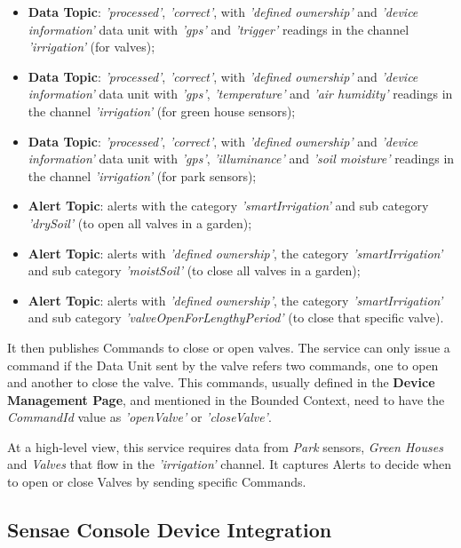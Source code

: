 \begin{itemize}
    \item \textbf{Data Topic}: \textit{'processed'}, \textit{'correct'}, with \textit{'defined ownership'} and \textit{'device information'} data unit with \textit{'gps'} and \textit{'trigger'} readings in the channel \textit{'irrigation'} (for valves);
    \item \textbf{Data Topic}: \textit{'processed'}, \textit{'correct'}, with \textit{'defined ownership'} and \textit{'device information'} data unit with \textit{'gps'}, \textit{'temperature'} and \textit{'air humidity'} readings in the channel \textit{'irrigation'} (for green house sensors);
    \item \textbf{Data Topic}: \textit{'processed'}, \textit{'correct'}, with \textit{'defined ownership'} and \textit{'device information'} data unit with \textit{'gps'}, \textit{'illuminance'} and \textit{'soil moisture'} readings in the channel \textit{'irrigation'} (for park sensors);
    \item \textbf{Alert Topic}: alerts with the category \textit{'smartIrrigation'} and sub category \textit{'drySoil'} (to open all valves in a garden);
    \item \textbf{Alert Topic}: alerts with \textit{'defined ownership'}, the category \textit{'smartIrrigation'} and sub category \textit{'moistSoil'} (to close all valves in a garden);
    \item \textbf{Alert Topic}: alerts with \textit{'defined ownership'}, the category \textit{'smartIrrigation'} and sub category \textit{'valveOpenForLengthyPeriod'} (to close that specific valve).
\end{itemize}

It then publishes Commands to close or open valves. The service can only issue a command if the Data Unit sent by the valve refers two commands, one to open and another to close the valve. This commands, usually defined in the \textbf{Device Management Page}, and mentioned in the  Bounded Context, need to have the \textit{CommandId} value as \textit{'openValve'} or \textit{'closeValve'}.

At a high-level view, this service requires data from \textit{Park} sensors, \textit{Green Houses} and \textit{Valves} that flow in the \textit{'irrigation'} channel. It captures Alerts to decide when to open or close Valves by sending specific Commands.

\subsection{Sensae Console Device Integration}
\label{subsec:implementation:description:sensor}

